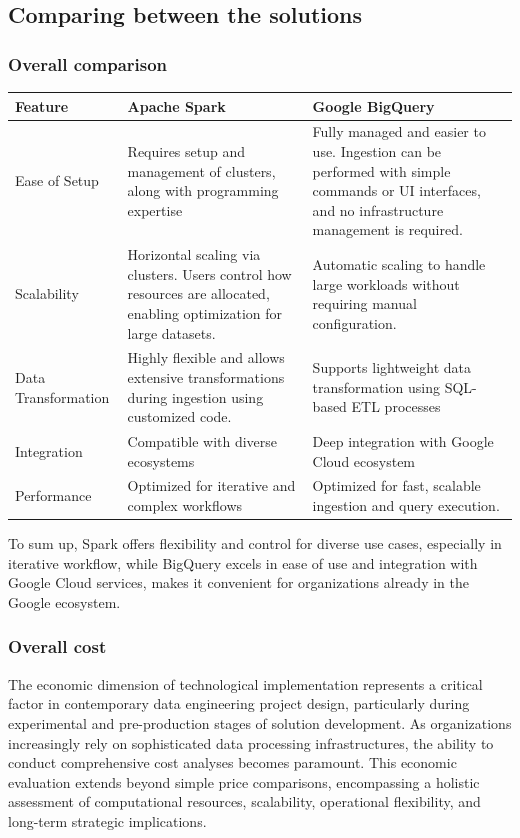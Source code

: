 \subsection{Comparing between the solutions}
\subsubsection{Overall comparison}
\begin{center}
\begin{tabular}{ |p{1in}|p{2.5in}|p{2.5in}| } 
 \hline
 Feature & Apache Spark & Google BigQuery \\
 \hline
 Ease of Setup&Requires setup and management of clusters, along with programming expertise 	 & Fully managed and easier to use. Ingestion can be performed with simple commands or UI interfaces, and no infrastructure management is required. \\
 \hline
 Scalability	 & Horizontal scaling via clusters. Users control how resources are allocated, enabling optimization for large datasets.	 & Automatic scaling to handle large workloads without requiring manual configuration.\\ 
 \hline
 Data Transformation& Highly flexible and allows extensive transformations during ingestion using customized code.	&Supports lightweight data transformation using SQL-based ETL processes\\
\hline
Integration&Compatible with diverse ecosystems&	Deep integration with Google Cloud ecosystem\\
\hline
Performance&Optimized for iterative and complex workflows&Optimized for fast, scalable ingestion and query execution. \\
\hline
\end{tabular}
\end{center}
To sum up,  Spark offers flexibility and control for diverse use cases, especially in iterative workflow, while BigQuery excels in ease of use and integration with Google Cloud services, makes it convenient for organizations already in the Google ecosystem.
\subsubsection{Overall cost}
The economic dimension of technological implementation represents a critical factor in contemporary
data engineering project design, particularly during experimental and pre-production stages of
solution development. As organizations increasingly rely on sophisticated data processing
infrastructures, the ability to conduct comprehensive cost analyses becomes paramount. This economic
evaluation extends beyond simple price comparisons, encompassing a holistic assessment of
computational resources, scalability, operational flexibility, and long-term strategic implications.

